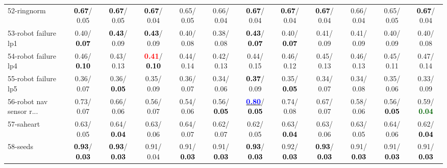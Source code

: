 \begin{table}[h]
\begin{center}
{\begin{tabular}{lc|c|c|c|c|c|c|c|c|c|c}
52-ringnorm & \textcolor{black}{\textbf{  0.67}}/  0.05 & \textcolor{black}{\textbf{  0.67}}/  0.05 & \textcolor{black}{\textbf{  0.67}}/  0.04 &   0.65/  0.05 &   0.66/  0.04 & \textcolor{black}{\textbf{  0.67}}/  0.04 & \textcolor{black}{\textbf{  0.67}}/  0.04 & \textcolor{black}{\textbf{  0.67}}/  0.04 &   0.66/  0.04 &   0.65/  0.05 & \textcolor{black}{\textbf{  0.67}}/  0.04 \\
53-robot failure lp1 &   0.40/\textcolor{black}{\textbf{  0.07}} & \textcolor{black}{\textbf{  0.43}}/  0.09 & \textcolor{black}{\textbf{  0.43}}/  0.09 &   0.40/  0.08 &   0.38/  0.08 & \textcolor{black}{\textbf{  0.43}}/\textcolor{black}{\textbf{  0.07}} &   0.40/\textcolor{black}{\textbf{  0.07}} &   0.41/  0.09 &   0.41/  0.09 &   0.40/  0.09 &   0.40/  0.08 \\ \hline
54-robot failure lp4 &   0.46/\textcolor{black}{\textbf{  0.10}} &   0.43/  0.13 & \textcolor{red}{\textbf{  0.41}}/\textcolor{black}{\textbf{  0.10}} &   0.44/  0.14 &   0.42/  0.13 &   0.44/  0.15 &   0.46/  0.12 &   0.45/  0.13 &   0.46/  0.13 &   0.45/  0.11 &   0.47/  0.14 \\
55-robot failure lp5 &   0.36/  0.07 &   0.36/\textcolor{black}{\textbf{  0.05}} &   0.35/  0.09 &   0.36/  0.07 &   0.34/  0.06 & \textcolor{black}{\textbf{  0.37}}/  0.09 &   0.35/\textcolor{black}{\textbf{  0.05}} &   0.34/  0.07 &   0.34/  0.08 &   0.35/  0.06 &   0.33/  0.09 \\
56-robot nav sensor r... &   0.73/  0.07 &   0.66/  0.06 &   0.56/  0.07 &   0.54/  0.06 &   0.56/\textcolor{black}{\textbf{  0.05}} & \underline{\textcolor{blue}{\textbf{  0.80}}}/\textcolor{black}{\textbf{  0.05}} &   0.74/  0.08 &   0.67/  0.07 &   0.58/  0.06 &   0.56/\textcolor{black}{\textbf{  0.05}} &   0.59/\textcolor{darkgreen}{\textbf{  0.04}} \\
57-saheart &   0.63/  0.05 &   0.64/\textcolor{black}{\textbf{  0.04}} &   0.63/  0.06 &   0.64/  0.07 &   0.62/  0.07 &   0.62/  0.05 &   0.63/\textcolor{black}{\textbf{  0.04}} &   0.63/  0.06 &   0.63/  0.05 &   0.64/  0.06 &   0.62/\textcolor{black}{\textbf{  0.04}} \\
58-seeds & \textcolor{black}{\textbf{  0.93}}/\textcolor{black}{\textbf{  0.03}} & \textcolor{black}{\textbf{  0.93}}/\textcolor{black}{\textbf{  0.03}} &   0.91/  0.04 &   0.91/\textcolor{black}{\textbf{  0.03}} &   0.91/\textcolor{black}{\textbf{  0.03}} & \textcolor{black}{\textbf{  0.93}}/\textcolor{black}{\textbf{  0.03}} &   0.92/\textcolor{black}{\textbf{  0.03}} & \textcolor{black}{\textbf{  0.93}}/\textcolor{black}{\textbf{  0.03}} &   0.91/\textcolor{black}{\textbf{  0.03}} &   0.91/\textcolor{black}{\textbf{  0.03}} &   0.91/\textcolor{black}{\textbf{  0.03}} \\

\end{tabular}}
\end{center}
\end{table}
